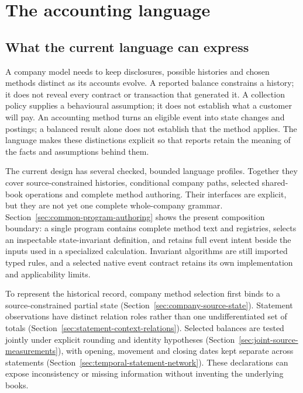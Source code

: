 \chapter{The accounting language}
\label{ch:language}

\section{What the current language can express}

A company model needs to keep disclosures, possible histories and chosen
methods distinct as its accounts evolve. A reported balance constrains a
history; it does not reveal every contract or transaction that generated it.
A collection policy supplies a behavioural assumption; it does not establish
what a customer will pay. An accounting method turns an eligible event into
state changes and postings; a balanced result alone does not establish that
the method applies. The language makes these distinctions explicit so that
reports retain the meaning of the facts and assumptions behind them.

The current design has several checked, bounded language profiles. Together
they cover source-constrained histories, conditional company paths, selected
shared-book operations and complete method authoring. Their interfaces are
explicit, but they are not yet one complete whole-company grammar.
Section~\ref{sec:common-program-authoring} shows the present composition
boundary: a single program contains complete method text and registries,
selects an inspectable state-invariant definition, and retains full event
intent beside the inputs used in a specialized calculation. Invariant
algorithms are still imported typed rules, and a selected native event
contract retains its own implementation and applicability limits.

To represent the historical record, company method selection first binds to
a source-constrained partial state
(Section~\ref{sec:company-source-state}). Statement observations have
distinct relation roles rather than one undifferentiated set of totals
(Section~\ref{sec:statement-context-relations}). Selected balances are tested
jointly under explicit rounding and identity hypotheses
(Section~\ref{sec:joint-source-measurements}), with opening, movement and
closing dates kept separate across statements
(Section~\ref{sec:temporal-statement-network}). These declarations can expose
inconsistency or missing information without inventing the underlying books.

